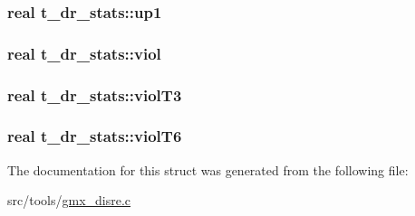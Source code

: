 \hypertarget{structt__dr__stats_a33f831d1b62e1904773e34bc145ab437}{
\subsubsection[{up1}]{\setlength{\rightskip}{0pt plus 5cm}real {\bf t\-\_\-dr\-\_\-stats\-::up1}}}\label{structt__dr__stats_a33f831d1b62e1904773e34bc145ab437}
\hypertarget{structt__dr__stats_a7566e50413828da007f25cef7584ba39}{
\subsubsection[{viol}]{\setlength{\rightskip}{0pt plus 5cm}real {\bf t\-\_\-dr\-\_\-stats\-::viol}}}\label{structt__dr__stats_a7566e50413828da007f25cef7584ba39}
\hypertarget{structt__dr__stats_a258d37b717e9da0af47822c6cdb70566}{
\subsubsection[{viol\-T3}]{\setlength{\rightskip}{0pt plus 5cm}real {\bf t\-\_\-dr\-\_\-stats\-::viol\-T3}}}\label{structt__dr__stats_a258d37b717e9da0af47822c6cdb70566}
\hypertarget{structt__dr__stats_a7e19ea93de8d3e81fd132e9d5628ccf5}{
\subsubsection[{viol\-T6}]{\setlength{\rightskip}{0pt plus 5cm}real {\bf t\-\_\-dr\-\_\-stats\-::viol\-T6}}}\label{structt__dr__stats_a7e19ea93de8d3e81fd132e9d5628ccf5}


\-The documentation for this struct was generated from the following file\-:\begin{DoxyCompactItemize}
\item 
src/tools/\hyperlink{gmx__disre_8c}{gmx\-\_\-disre.\-c}\end{DoxyCompactItemize}
